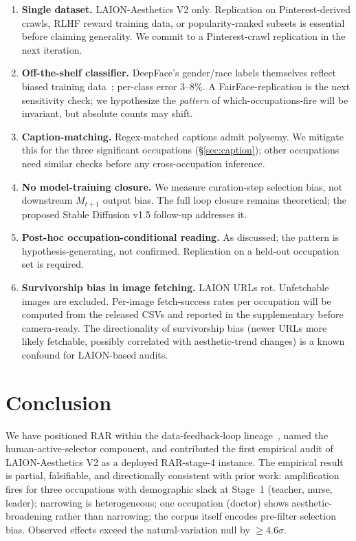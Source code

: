 \documentclass[manuscript, nonacm, screen, review]{acmart}
\begin{document}
\begin{enumerate}\itemsep0pt
\item \textbf{Single dataset.} LAION-Aesthetics V2 only. Replication on Pinterest-derived crawls, RLHF reward training data, or popularity-ranked subsets is essential before claiming generality. We commit to a Pinterest-crawl replication in the next iteration.
\item \textbf{Off-the-shelf classifier.} DeepFace's gender/race labels themselves reflect biased training data~\cite{buolamwini2018gender}; per-class error 3--8\%. A FairFace-replication is the next sensitivity check; we hypothesize the \emph{pattern} of which-occupations-fire will be invariant, but absolute counts may shift.
\item \textbf{Caption-matching.} Regex-matched captions admit polysemy. We mitigate this for the three significant occupations (§\ref{sec:caption}); other occupations need similar checks before any cross-occupation inference.
\item \textbf{No model-training closure.} We measure curation-step selection bias, not downstream $M_{t+1}$ output bias. The full loop closure remains theoretical; the proposed Stable Diffusion v1.5 follow-up addresses it.
\item \textbf{Post-hoc occupation-conditional reading.} As discussed; the pattern is hypothesis-generating, not confirmed. Replication on a held-out occupation set is required.
\item \textbf{Survivorship bias in image fetching.} LAION URLs rot. Unfetchable images are excluded. Per-image fetch-success rates per occupation will be computed from the released CSVs and reported in the supplementary before camera-ready. The directionality of survivorship bias (newer URLs more likely fetchable, possibly correlated with aesthetic-trend changes) is a known confound for LAION-based audits.
\end{enumerate}

\section{Conclusion}

We have positioned RAR within the data-feedback-loop lineage~\cite{taori2022data,ferbach2024selfconsuming}, named the human-active-selector component, and contributed the first empirical audit of LAION-Aesthetics V2 as a deployed RAR-stage-4 instance. The empirical result is partial, falsifiable, and directionally consistent with prior work: amplification fires for three occupations with demographic slack at Stage~1 (teacher, nurse, leader); narrowing is heterogeneous; one occupation (doctor) shows aesthetic-broadening rather than narrowing; the corpus itself encodes pre-filter selection bias. Observed effects exceed the natural-variation null by $\geq 4.6\sigma$.
\end{document}
